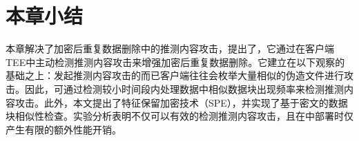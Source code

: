 \section{本章小结}
\label{sec:featurespy-conclusion}
本章解决了加密后重复数据删除中的推测内容攻击，提出了\sysnameF，它通过在客户端TEE中主动检测推测内容攻击来增强加密后重复数据删除。它建立在以下观察的基础之上：发起推测内容攻击的而已客户端往往会枚举大量相似的伪造文件进行攻击。因此，可通过检测较小时间段内处理数据中相似数据块出现频率来检测推测内容攻击。此外，本文提出了特征保留加密技术（SPE），并实现了基于密文的数据块相似性检查。实验分析表明\sysnameF 不仅可以有效的检测推测内容攻击，且在\sysnameS 中部署时仅产生有限的额外性能开销。
